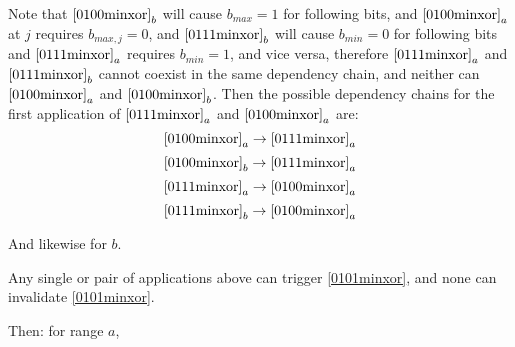 \documentclass{article}
\begin{document}
Note that $\eqref{0100minxor}_b$ will cause $b_{max} = 1$ for 
following bits, and
$\eqref{0100minxor}_a$ at $j$ requires $b_{max,j} = 0$, and
$\eqref{0111minxor}_b$ will cause $b_{min} = 0$ for following bits
and $\eqref{0111minxor}_a$ requires $b_{min} = 1$, and vice versa,
therefore 
$\eqref{0111minxor}_a$ and
$\eqref{0111minxor}_b$ cannot coexist in the same dependency chain, and
neither can $\eqref{0100minxor}_a$ and $\eqref{0100minxor}_b$.
Then the possible dependency chains for the first application of 
$\eqref{0111minxor}_a$ and $\eqref{0100minxor}_a$ are:
\begin{equation*} 
\eqref{0100minxor}_a \rightarrow 
\eqref{0111minxor}_a
\end{equation*}
\begin{equation*} 
\eqref{0100minxor}_b \rightarrow 
\eqref{0111minxor}_a
\end{equation*}
\begin{equation*} 
\eqref{0111minxor}_a \rightarrow 
\eqref{0100minxor}_a
\end{equation*}
\begin{equation*} 
\eqref{0111minxor}_b \rightarrow 
\eqref{0100minxor}_a
\end{equation*}

And likewise for $b$.

Any single or pair of applications above can trigger
\eqref{0101minxor}, and none can invalidate 
\eqref{0101minxor}.

\vspace{10pt}

Then: for range $a$,
\vspace{10pt}
\end{document}
